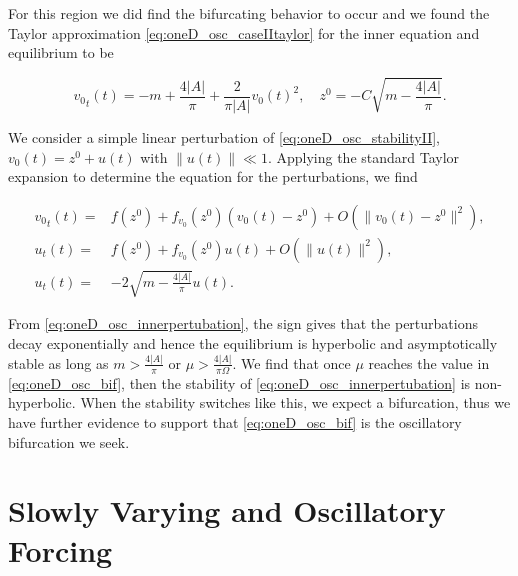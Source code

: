 For this region we did find the bifurcating behavior to occur and we found the Taylor approximation \eqref{eq:oneD_osc_caseIItaylor} for the inner equation and equilibrium to be

\begin{equation}\label{eq:oneD_osc_stabilityII}
{v_0}_t(t)= -m +\frac{4|A|}{\pi}+\frac{2}{\pi |A|}v_0(t)^2,\quad z^0=-C \sqrt{m-\frac{4|A|}{\pi}}.
\end{equation}

We consider a simple linear perturbation of \eqref{eq:oneD_osc_stabilityII}, $v_0(t)=z^0+u(t)$ with $\lVert u(t) \rVert \ll 1$. Applying the standard Taylor expansion to determine the equation for the perturbations, we find

\begin{equation}\label{eq:oneD_osc_innerpertubation}
\begin{aligned}
{v_0}_t(t) =& f(z^0)+f_{v_0}(z^0)(v_0(t)-z^0)+ O(\lVert v_0(t)-z^0\rVert^2),\\ 
u_t(t) =& f(z^0)+f_{v_0}(z^0)u(t)+O(\lVert u(t) \rVert^2),\\
u_t(t) =& -2\sqrt{m-\frac{4|A|}{\pi}} u(t) .
\end{aligned}
\end{equation}

From \eqref{eq:oneD_osc_innerpertubation}, the sign gives that the perturbations decay exponentially and hence the equilibrium is hyperbolic and asymptotically stable as long as $m>\frac{4|A|}{\pi}$ or $\mu>\frac{4|A|}{\pi \Omega}$. We find that once $\mu$ reaches the value in \eqref{eq:oneD_osc_bif}, then the stability of \eqref{eq:oneD_osc_innerpertubation} is non-hyperbolic. When the stability switches like this, we expect a bifurcation, thus we have further evidence to support that \eqref{eq:oneD_osc_bif} is the oscillatory bifurcation we seek.

\section{Slowly Varying and Oscillatory Forcing}
\label{sec:oneD_slowosc}

